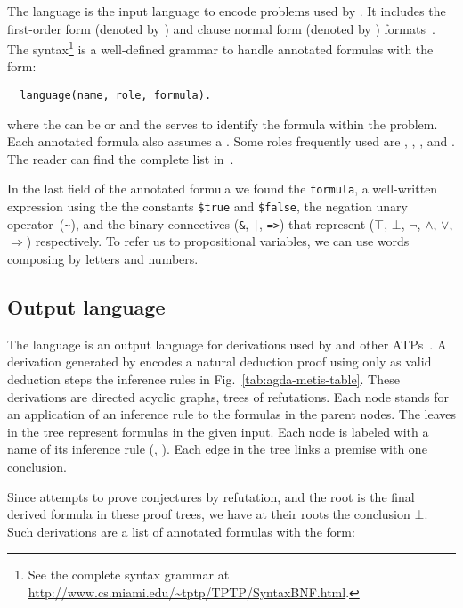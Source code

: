 \documentclass[../main.tex]{subfiles}
\begin{document}
The \TPTP language is the input language to encode problems used by \Metis.
It includes the first-order form (denoted by ) and clause normal
form (denoted by ) formats~\cite{sutcliffe2009}.
The \TPTP syntax\footnote{See the complete syntax grammar
at \url{http://www.cs.miami.edu/~tptp/TPTP/SyntaxBNF.html}.} is a
well-defined grammar to handle annotated formulas with the form:
\begin{verbatim}
  language(name, role, formula).
\end{verbatim}
where the  can be  or  and the  serves
to identify the formula within the problem. Each
annotated formula also assumes a . Some roles frequently used are ,
, ,  and . The reader
can find the complete list in~\cite{sutcliffe2009}.

In the last field of the annotated formula we found the \texttt{formula},
a well-written expression using the
the constants \verb!$true! and \verb!$false!, the negation unary
operator~(\verb!~!), and the binary connectives
(\verb!&!, \verb!|!, \verb!=>!) that represent
($⊤$, $⊥$, $¬$, $∧$, $∨$, $⇒$) respectively.
To refer us to propositional variables, we can use words composing by letters and numbers.


\subsection{Output language}
\label{ssec:output-language}

The \TSTP language is an output language for derivations used by
\Metis and other ATPs~\cite{Sutcliffe-Schulz-Claessen-VanGelder-2006}.
A \TSTP  derivation generated by \Metis encodes a natural
deduction proof using only as valid deduction steps the inference rules
in Fig.~\ref{tab:agda-metis-table}.
These derivations are directed acyclic graphs, trees of refutations.
Each node stands for an application of an inference rule to the formulas
in the parent nodes. The leaves in the tree represent formulas in the given
\TPTP input. Each node is labeled with a name of its inference rule (\eg, \canonicalize).
Each edge in the tree links a premise with one conclusion.

Since \Metis attempts to prove conjectures by refutation, and the root
is the final derived formula in these proof trees,  we have at their
roots the conclusion $⊥$. Such derivations are a list of annotated
formulas with the form:
\end{document}
